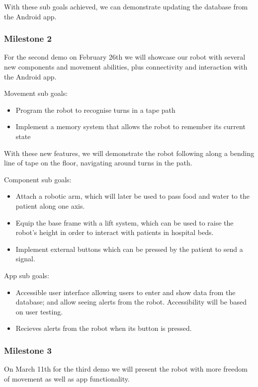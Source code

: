 \documentclass{article}
\begin{document}
With these sub goals achieved, we can demonstrate updating the database from the Android app.

\subsubsection{Milestone 2}

For the second demo on February 26th we will showcase our robot with several new components and movement abilities, plus connectivity and interaction with the Android app.  

Movement sub goals:
\begin{itemize}
\item Program the robot to recognise turns in a tape path
\item Implement a memory system that allows the robot to remember its current state 
\end{itemize}

With these new features, we will demonstrate the robot following along a bending line of tape on the floor, navigating around turns in the path. %

Component sub goals:
\begin{itemize}
\item Attach a robotic arm, which will later be used to pass food and water to the patient along one axis.
\item Equip the base frame with a lift system, which can be used to raise the robot's height in order to interact with patients in hospital beds.
\item Implement external buttons which can be pressed by the patient to send a signal.
\end{itemize}

App sub goals:
\begin{itemize}
\item Accessible user interface allowing users to enter and show data from the database; and allow seeing alerts from the robot. Accessibility will be based on user testing.  
\item Recieves alerts from the robot when its button is pressed.
\end{itemize}

\subsubsection{Milestone 3}

On March 11th for the third demo we will present the robot with more freedom of movement as well as app functionality. 
\end{document}
